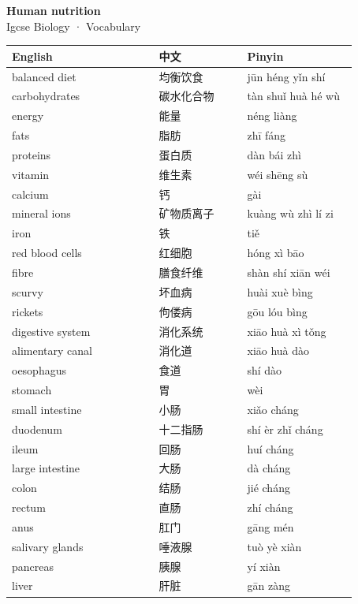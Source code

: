\documentclass[11pt]{article}
\begin{document}
\begin{center}
  {\LARGE\bfseries Human nutrition}\\[0.35em]
  {\large Igcse Biology · Vocabulary}
\end{center}
\vspace{0.6em}

\begin{longtable}{@{}p{0.40\linewidth}p{0.24\linewidth}p{0.30\linewidth}@{}}
\toprule
\textbf{English} & \textbf{中文} & \textbf{Pinyin} \\
\midrule
\endhead
\bottomrule
\endlastfoot
balanced diet & 均衡饮食 & jūn héng yǐn shí \\
carbohydrates & 碳水化合物 & tàn shuǐ huà hé wù \\
energy & 能量 & néng liàng \\
fats & 脂肪 & zhī fáng \\
proteins & 蛋白质 & dàn bái zhì \\
vitamin & 维生素 & wéi shēng sù \\
calcium & 钙 & gài \\
mineral ions & 矿物质离子 & kuàng wù zhì lí zi \\
iron & 铁 & tiě \\
red blood cells & 红细胞 & hóng xì bāo \\
fibre & 膳食纤维 & shàn shí xiān wéi \\
scurvy & 坏血病 & huài xuè bìng \\
rickets & 佝偻病 & gōu lóu bìng \\
digestive system & 消化系统 & xiāo huà xì tǒng \\
alimentary canal & 消化道 & xiāo huà dào \\
oesophagus & 食道 & shí dào \\
stomach & 胃 & wèi \\
small intestine & 小肠 & xiǎo cháng \\
duodenum & 十二指肠 & shí èr zhǐ cháng \\
ileum & 回肠 & huí cháng \\
large intestine & 大肠 & dà cháng \\
colon & 结肠 & jié cháng \\
rectum & 直肠 & zhí cháng \\
anus & 肛门 & gāng mén \\
salivary glands & 唾液腺 & tuò yè xiàn \\
pancreas & 胰腺 & yí xiàn \\
liver & 肝脏 & gān zàng \\

\end{longtable}
\end{document}
